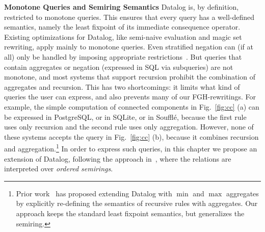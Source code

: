

{\bf Monotone Queries and Semiring Semantics} Datalog is, by
definition, restricted to monotone queries.  This ensures that every
query has a well-defined semantics, namely the least fixpoint of its
immediate consequence operator.  Existing optimizations for Datalog,
like semi-naive evaluation and magic set rewriting, apply mainly to
monotone queries. Even stratified negation can (if at all)
only be handled by imposing appropriate restrictions~\cite{DBLP:journals/corr/abs-1909-08246}.
But queries that contain aggregates or negation
(expressed in SQL via subqueries) are not monotone, and most systems
that support recursion prohibit the combination of aggregates and
recursion.  This has two shortcomings: it limits what kind of queries
the user can express, and also prevents many of our FGH-rewritings.
For example, the simple computation of connected components in
Fig.~\ref{fig:cc} (a) can be expressed in PostgreSQL, or in SQLite, or
in Soufflé,
because the first rule uses
only recursion and the second rule uses only aggregation.  However,
none of these systems accepts the query in Fig.~\ref{fig:cc} (b),
because it combines recursion and aggregation.\footnote{Prior
  work~\cite{DBLP:conf/pods/GangulyGZ91,DBLP:journals/tkde/SeoGL15}
  has proposed extending Datalog with $\min$ and $\max$ aggregates by
  explicitly re-defining the semantics of recursive rules with
  aggregates.  Our approach keeps the standard least fixpoint
  semantics, but generalizes the semiring.}  In order to express such
queries, in this chapter we propose an extension of Datalog, following
the approach in~\cite{DBLP:conf/pods/GreenKT07}, where the relations
are interpreted over {\em ordered semirings}.

